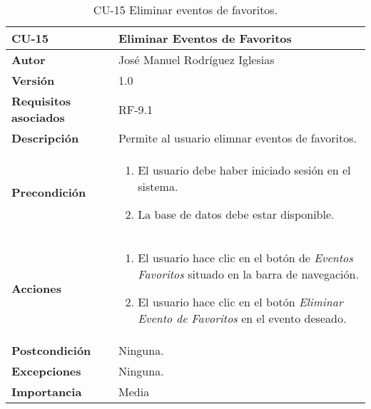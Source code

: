 \begin{table}[h]
	\centering
	\begin{tabularx}{\linewidth}{ p{} p{} }
		\toprule
		\textbf{CU-15}    & \textbf{Eliminar Eventos de Favoritos}\\
		\toprule
            \textbf{Autor}                & José Manuel Rodríguez Iglesias \\
		\textbf{Versión}              & 1.0    \\
		\textbf{Requisitos asociados} & RF-9.1\\
		\textbf{Descripción}          & Permite al usuario elimnar eventos de favoritos. \\
		\textbf{Precondición}         &  
            \begin{enumerate}
			\def\labelenumi{\arabic{enumi}.}
			\tightlist
			\item El usuario debe haber iniciado sesión en el sistema.
			\item La base de datos debe estar disponible.
		\end{enumerate}\\
    
  
		\textbf{Acciones}             &
		\begin{enumerate}
			\def\labelenumi{\arabic{enumi}.}
			\tightlist
			\item El usuario hace clic en el botón de\textit{ Eventos Favoritos} situado en la barra de navegación.
                 \item El usuario hace clic en el botón \textit{Eliminar Evento de Favoritos} en el evento deseado.
                 
		\end{enumerate}\\
		\textbf{Postcondición}        & Ninguna.\\
		\textbf{Excepciones}          &Ninguna.\\
		\textbf{Importancia}          & Media\\
		\bottomrule
	\end{tabularx}
	\caption{CU-15 Eliminar eventos de favoritos.}
\end{table}